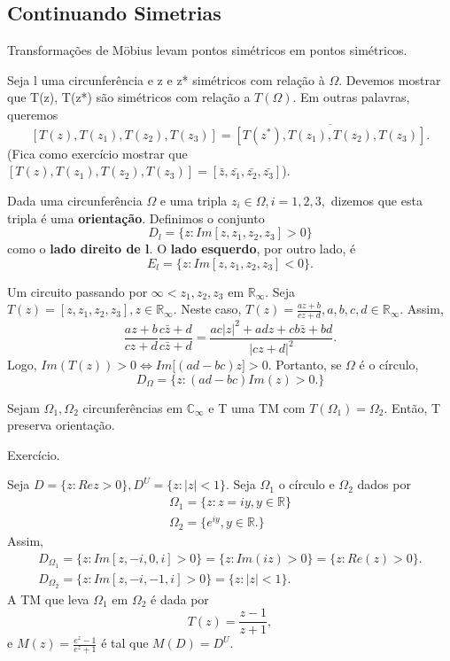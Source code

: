 \documentclass[complex.tex]{subfiles}
\begin{document}
\subsection{Continuando Simetrias}
\begin{prop*}
	Transformações de M\"{o}bius levam pontos simétricos em pontos simétricos.
\end{prop*}
\begin{proof*}
	Seja l uma circunferência e z e z* simétricos com relação à $\Omega.$  Devemos mostrar que T(z), T(z*) são simétricos
	com relação a $T(\Omega)$. Em outras palavras, queremos
	$$
		[T(z), T(z_{1}), T(z_2), T(z_3)] = \overline{[T(z^*), T(z_1), T(z_2), T(z_3)]}.
	$$
	(Fica como exercício mostrar que $[T(z), T(z_{1}), T(z_2), T(z_3)] = [\bar{z}, \bar{z_1}, \bar{z_2}, \bar{z_3}]$).
\end{proof*}
\begin{def*}
	Dada uma circunferência $\Omega$ e uma tripla $z_{i}\in \Omega, i = 1, 2, 3,$ dizemos que esta tripla é uma \textbf{orientação}.
	Definimos o conjunto
	$$
		D_{l} = \{z: Im[z, z_1, z_2, z_3] > 0\}
	$$
	como o \textbf{lado direito de l}. O \textbf{lado esquerdo}, por outro lado, é
	$$
		E_{l} = \{z: Im[z, z_1, z_2, z_3] < 0\}.
	$$
\end{def*}
\begin{example}
	Um circuito passando por $\infty < z_1, z_2, z_3\text{ em }\mathbb{R}_\infty.$ Seja $T(z) = [z, z_1, z_2, z_3], z\in \mathbb{R}_\infty$.
	Neste caso, $T(z) = \frac{az + b}{cz + d}, a, b, c, d\in \mathbb{R}_\infty$. Assim,
	$$
		\frac{az + b}{cz + d}\frac{c\bar{z} + d}{c\bar{z} + d} = \frac{ac|z|^2 + adz + cb\bar{z} + bd}{|cz+d|^2}.
	$$
	Logo, $Im(T(z)) > 0\Longleftrightarrow Im\biggl[(ad-bc)z\biggr] > 0.$ Portanto, se $\Omega$ é o círculo,
	$$
		D_{\Omega} = \{z: (ad - bc)Im(z) > 0.\}
	$$
\end{example}
\begin{prop*}
	Sejam $\Omega_1, \Omega_2$ circunferências em $\mathbb{C}_\infty$ e T uma TM com $T(\Omega_1) = \Omega_2.$ Então, T preserva
	orientação.
\end{prop*}
\begin{proof*}
	Exercício.
\end{proof*}
\begin{example}
	Seja $D = \{z: Re z > 0\}, D^U = \{z: |z| < 1\} $. Seja $\Omega_1$ o círculo e $\Omega_2$ dados por
	\begin{align*}
		\Omega_1 = \{z: z = iy, y\in \mathbb{R}\} \\
		\Omega_2 = \{e^{iy}, y\in \mathbb{R}.\}
	\end{align*}
	Assim,
	\begin{align*}
		D_{\Omega_1} = \{z: Im[z, -i, 0, i] > 0\} = \{z: Im(iz) > 0\} = \{z: Re(z) > 0\}. \\
		D_{\Omega_2} = \{z: Im[z, -i, -1, i] > 0\} = \{z: |z| < 1\}.
	\end{align*}
	A TM que leva $\Omega_1\text{ em }\Omega_2$ é dada por
	$$
		T(z) = \frac{z-1}{z+1},
	$$
	e $M(z) = \frac{e^{z} - 1}{e^{z} + 1}$ é tal que $M(D) = D^U.$
\end{example}
\end{document}
